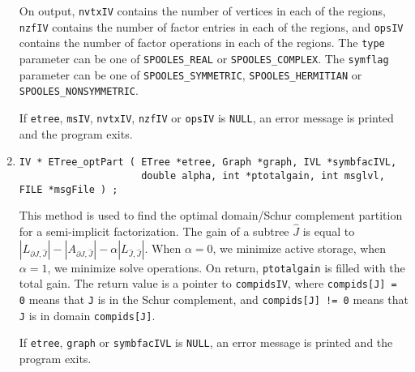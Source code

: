 \begin{enumerate}
On output, {\tt nvtxIV} contains the number of vertices in each of
the regions,
{\tt nzfIV} contains the number of factor entries in each of
the regions, and
{\tt opsIV} contains the number of factor operations in each of
the regions.
The {\tt type} parameter can be one of {\tt SPOOLES\_REAL} or
{\tt SPOOLES\_COMPLEX}.
The {\tt symflag} parameter can be one of {\tt SPOOLES\_SYMMETRIC},
{\tt SPOOLES\_HERMITIAN} or {\tt SPOOLES\_NONSYMMETRIC}.
\par {}
If {\tt etree}, {\tt msIV}, {\tt nvtxIV}, {\tt nzfIV} 
or {\tt opsIV} is {\tt NULL},
an error message is printed and the program exits.
\item
\begin{verbatim}
IV * ETree_optPart ( ETree *etree, Graph *graph, IVL *symbfacIVL,
                     double alpha, int *ptotalgain, int msglvl, FILE *msgFile ) ;
\end{verbatim}
This method is used to find the optimal domain/Schur complement
partition for a semi-implicit factorization.
The gain of a subtree ${\widehat J}$ is equal to
$|L_{\partial{J},{\widehat J}}|
- |A_{\partial{J},{\widehat J}}|
- \alpha |L_{{\widehat J},{\widehat J}}|$.
When $\alpha = 0$, we minimize active storage,
when $\alpha = 1$, we minimize solve operations.
On return, {\tt *ptotalgain} is filled with the total gain.
The return value is a pointer to {\tt compidsIV},
where {\tt compids[J] = 0} means that {\tt J} is in the Schur
complement,
and {\tt compids[J] != 0} means that {\tt J} is in 
domain {\tt compids[J]}.
\par {}
If {\tt etree}, {\tt graph} or {\tt symbfacIVL}
is {\tt NULL},
an error message is printed and the program exits.
\end{enumerate}
\par
